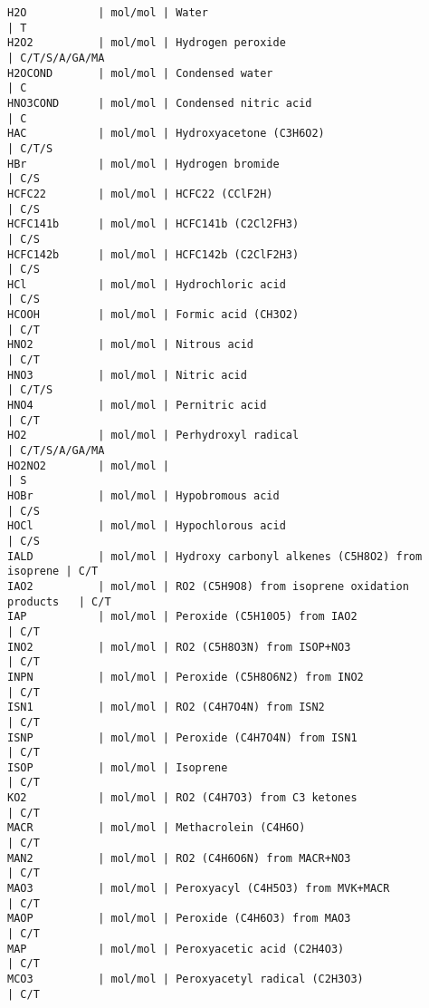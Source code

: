 {\begin{verbatim}
H2O           | mol/mol | Water                                           | T
H2O2          | mol/mol | Hydrogen peroxide                               | C/T/S/A/GA/MA
H2OCOND       | mol/mol | Condensed water                                 | C
HNO3COND      | mol/mol | Condensed nitric acid                           | C
HAC           | mol/mol | Hydroxyacetone (C3H6O2)                         | C/T/S
HBr           | mol/mol | Hydrogen bromide                                | C/S
HCFC22        | mol/mol | HCFC22 (CClF2H)                                 | C/S
HCFC141b      | mol/mol | HCFC141b (C2Cl2FH3)                             | C/S
HCFC142b      | mol/mol | HCFC142b (C2ClF2H3)                             | C/S
HCl           | mol/mol | Hydrochloric acid                               | C/S
HCOOH         | mol/mol | Formic acid (CH3O2)                             | C/T
HNO2          | mol/mol | Nitrous acid                                    | C/T
HNO3          | mol/mol | Nitric acid                                     | C/T/S
HNO4          | mol/mol | Pernitric acid                                  | C/T
HO2           | mol/mol | Perhydroxyl radical                             | C/T/S/A/GA/MA
HO2NO2        | mol/mol |                                                 | S
HOBr          | mol/mol | Hypobromous acid                                | C/S
HOCl          | mol/mol | Hypochlorous acid                               | C/S
IALD          | mol/mol | Hydroxy carbonyl alkenes (C5H8O2) from isoprene | C/T
IAO2          | mol/mol | RO2 (C5H9O8) from isoprene oxidation products   | C/T
IAP           | mol/mol | Peroxide (C5H10O5) from IAO2                    | C/T
INO2          | mol/mol | RO2 (C5H8O3N) from ISOP+NO3                     | C/T
INPN          | mol/mol | Peroxide (C5H8O6N2) from INO2                   | C/T
ISN1          | mol/mol | RO2 (C4H7O4N) from ISN2                         | C/T
ISNP          | mol/mol | Peroxide (C4H7O4N) from ISN1                    | C/T
ISOP          | mol/mol | Isoprene                                        | C/T
KO2           | mol/mol | RO2 (C4H7O3) from C3 ketones                    | C/T
MACR          | mol/mol | Methacrolein (C4H6O)                            | C/T
MAN2          | mol/mol | RO2 (C4H6O6N) from MACR+NO3                     | C/T
MAO3          | mol/mol | Peroxyacyl (C4H5O3) from MVK+MACR               | C/T
MAOP          | mol/mol | Peroxide (C4H6O3) from MAO3                     | C/T
MAP           | mol/mol | Peroxyacetic acid (C2H4O3)                      | C/T
MCO3          | mol/mol | Peroxyacetyl radical (C2H3O3)                   | C/T

\end{verbatim}}
